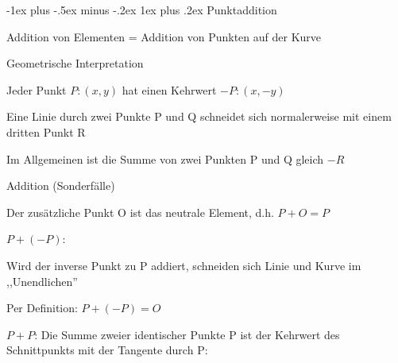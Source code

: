 \documentclass[a4paper]{article}
\makeatletter
\renewcommand{\subsubsection}{\@startsection{subsubsection}{3}{0mm}%
 {-1ex plus -.5ex minus -.2ex}%
 {1ex plus .2ex}%
 {\normalfont\small\bfseries}}
\makeatother
\begin{document}
\begin{multicols}{3}
      \subsubsection{Punktaddition}
      \begin{itemize*}
            \item Addition von Elementen = Addition von Punkten auf der Kurve
            \item Geometrische Interpretation
            \begin{itemize*}
                  \item Jeder Punkt $P:(x,y)$ hat einen Kehrwert $-P:(x,-y)$
                  \item Eine Linie durch zwei Punkte P und Q schneidet sich normalerweise mit einem dritten Punkt R
                  \item Im Allgemeinen ist die Summe von zwei Punkten P und Q gleich $-R$
            \end{itemize*}
            \item Addition (Sonderfälle)
            \begin{itemize*}
                  \item Der zusätzliche Punkt O ist das neutrale Element, d.h. $P+O=P$
                  \item $P + (-P)$:
                  \begin{itemize*}
                        \item Wird der inverse Punkt zu P addiert, schneiden sich Linie und Kurve im ,,Unendlichen''
                        \item Per Definition: $P+(-P) = O$
                  \end{itemize*}
                  \item $P+P$: Die Summe zweier identischer Punkte P ist der Kehrwert des Schnittpunkts mit der Tangente durch P:
            \end{itemize*}
      \end{itemize*}


\end{multicols}
\end{document}
